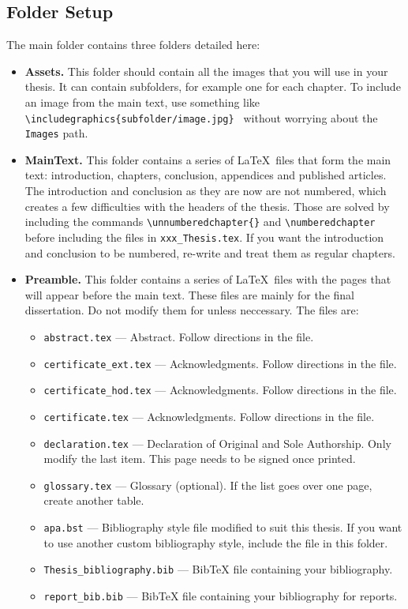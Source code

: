 \subsection{Folder Setup}
The main folder contains three folders detailed here:
\begin{itemize}

    \item \textbf{Assets.} This folder should contain all the images that you will use in your thesis. It can contain subfolders, for example one for each chapter. To include an image from the main text, use something like \texttt{\textbackslash includegraphics\{subfolder/image.jpg\} } without worrying about the \texttt{Images} path.

    \item \textbf{MainText.} This folder contains a series of \LaTeX\ files that form the main text: introduction, chapters, conclusion, appendices and published articles. The introduction and conclusion as they are now are not numbered, which creates a few difficulties with the headers of the thesis. Those are solved by including the commands \texttt{\textbackslash unnumberedchapter\{\}} and \texttt{\textbackslash numberedchapter} before including the files in \texttt{xxx\_Thesis.tex}. If you want the introduction and conclusion to be numbered, re-write and treat them as regular chapters.
    
    \item \textbf{Preamble.} This folder contains a series of \LaTeX\ files with the pages that will appear before the main text. These files are mainly for the final dissertation. Do not modify them for unless neccessary. The files are:
    \begin{itemize}
    \item \texttt{abstract.tex} --- Abstract. Follow directions in the file.
    \item \texttt{certificate\_ext.tex} --- Acknowledgments. Follow directions in the file.
    \item \texttt{certificate\_hod.tex} --- Acknowledgments. Follow directions in the file.
    \item \texttt{certificate.tex} --- Acknowledgments. Follow directions in the file.
    \item \texttt{declaration.tex} --- Declaration of Original and Sole Authorship. Only modify the last item. This page needs to be signed once printed.
    \item \texttt{glossary.tex} --- Glossary (optional). If the list goes over one page, create another table.
    \item \texttt{apa.bst} --- Bibliography style file modified to suit this thesis. If you want to use another custom bibliography style, include the file in this folder.
    \item \texttt{Thesis\_bibliography.bib} --- BibTeX file containing your bibliography.
    \item \texttt{report\_bib.bib} --- BibTeX file containing your bibliography for reports.
    \end{itemize}
    
    \end{itemize}

